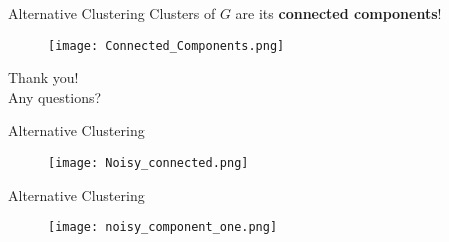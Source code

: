 \documentclass[aspectratio=169]{beamer}
\begin{document}
\begin{frame}{Alternative Clustering}
    \centering Clusters of $G$ are its \textbf{connected components}!

    \vspace{0.3cm}

    \begin{figure}
        \centering
        \texttt{[image: Connected\_Components.png]}
    \end{figure}
\end{frame}


\begin{emptyframe}
    Thank you!\\
    Any questions?
\end{emptyframe}

\begin{frame}{Alternative Clustering}

    \begin{figure}
        \centering
        \texttt{[image: Noisy\_connected.png]}
        \label{fig:enter-label}
    \end{figure}
\end{frame}

\begin{frame}{Alternative Clustering}
    \begin{figure}
        \centering
        \texttt{[image: noisy\_component\_one.png]}
        \label{fig:enter-label}
    \end{figure}
\end{frame}
\end{document}
